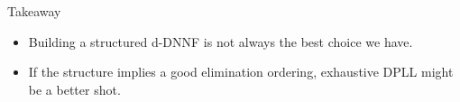 \begin{frame}[t]{Takeaway}
	\begin{itemize}[<+->]
		\item Building a structured d-DNNF is not always the best choice we have.
		\item If the structure implies a good elimination ordering, exhaustive DPLL might be a better shot.
	\end{itemize}

\end{frame}
